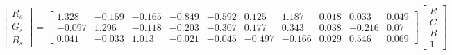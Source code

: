 \begin{equation}
\begin{bmatrix}
  R_s \\ G_s \\ B_s 
\end{bmatrix}=
\left[\begin{matrix}1.328 & -0.159 & -0.165 & -0.849 & -0.592 & 0.125 & 1.187 & 0.018 & 0.033 & 0.049\\ 
-0.097 & 1.296 & -0.118 & -0.203 & -0.307 & 0.177 & 0.343 & 0.038 & -0.216 & 0.07\\ 
0.041 & -0.033 & 1.013 & -0.021 & -0.045 & -0.497 & -0.166 & 0.029 & 0.546 & 0.069\end{matrix}\right]
\begin{bmatrix}
  R \\ G \\ B \\ 1 
\end{bmatrix}
\end{equation}
